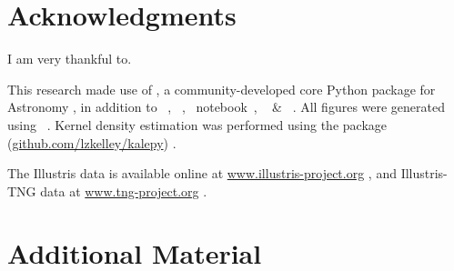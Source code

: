 \section*{Acknowledgments}
	I am very thankful to.

    This research made use of \astropy, a community-developed core Python package for Astronomy \citep{astropy2013}, in addition to \scipy~\citep{scipy}, \ipython~\citep{ipython}, \jupyter~notebook~\citep{jupyter}, \numpy~\citep{numpy2011} \& \sympy~\citep{sympy2017}.  All figures were generated using \matplotlib~\citep{matplotlib2007}.  Kernel density estimation was performed using the \kalepy{} package (\href{https://github.com/lzkelley/kalepy}{github.com/lzkelley/kalepy}) \citep{kalepy2020}.

    The Illustris data is available online at \href{https://www.illustris-project.org/}{www.illustris-project.org} \citep{Nelson+2015}, and Illustris-TNG data at \href{https://www.tng-project.org/}{www.tng-project.org} \citep{Nelson+2019}.



\let\oldUrl\url
\renewcommand{\url}[1]{\href{#1}{Link}}

\quad{}



\onecolumn
\clearpage



\appendix

    \section{Additional Material}
        \label{sec:app}

